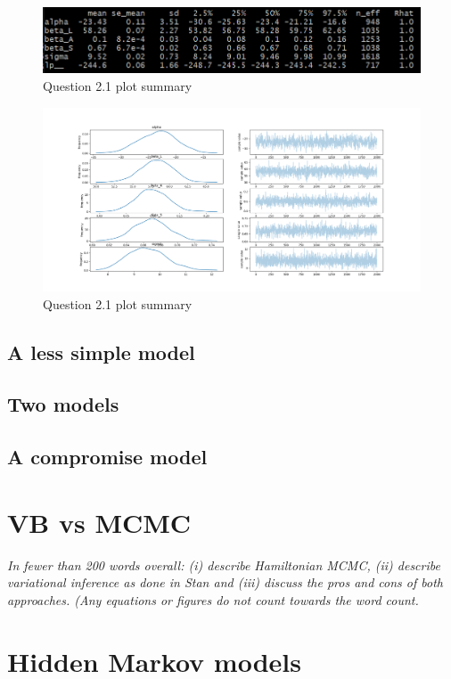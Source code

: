 \documentclass[11pt,a4paper]{article}
\begin{document}
  \begin{figure}[htb]
    \centering
      \includegraphics[width=\textwidth]{../q21/q21_summary_table.png}
      \caption{Question 2.1 plot summary}
    \label{tab:2.1}
  \end{figure}

  \begin{figure}[htb]
    \centering
      \includegraphics[width=\textwidth]{../q21/separated_features.png}
      \caption{Question 2.1 plot summary}
    \label{fig:2.1}
  \end{figure}


  \subsection{A less simple model}

  \subsection{Two models}

  \subsection{A compromise model}

\section{VB vs MCMC}

\textit{In fewer than 200 words overall: (i) describe Hamiltonian MCMC, (ii) describe variational inference as done in Stan and (iii) discuss the pros and cons of both approaches. (Any equations or figures do not count towards the word count.}

\section{Hidden Markov models}

\printbibliography
\end{document}
